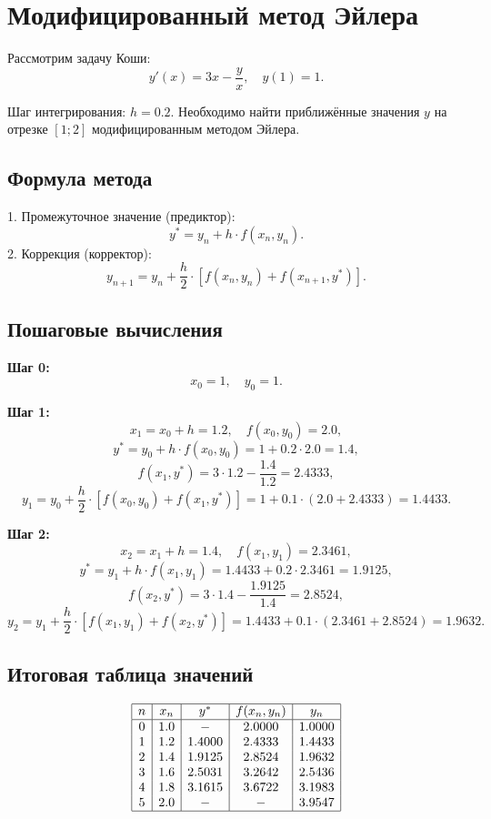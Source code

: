 \documentclass[a4paper,12pt]{article}
\begin{document}
\section{Модифицированный метод Эйлера}


Рассмотрим задачу Коши:
\[
y'(x) = 3x - \frac{y}{x}, \quad y(1) = 1.
\]

Шаг интегрирования: \( h = 0.2 \). Необходимо найти приближённые значения \( y \) на отрезке \([1; 2]\) модифицированным методом Эйлера.

\subsection*{Формула метода}
1. Промежуточное значение (предиктор):
\[
y^* = y_n + h \cdot f(x_n, y_n).
\]
2. Коррекция (корректор):
\[
y_{n+1} = y_n + \frac{h}{2} \cdot \left[f(x_n, y_n) + f(x_{n+1}, y^*)\right].
\]

\subsection*{Пошаговые вычисления}

\textbf{Шаг 0:}
\[
x_0 = 1, \quad y_0 = 1.
\]

\textbf{Шаг 1:}
\[
x_1 = x_0 + h = 1.2, \quad f(x_0, y_0) = 2.0,
\]
\[
y^* = y_0 + h \cdot f(x_0, y_0) = 1 + 0.2 \cdot 2.0 = 1.4,
\]
\[
f(x_1, y^*) = 3 \cdot 1.2 - \frac{1.4}{1.2} = 2.4333,
\]
\[
y_1 = y_0 + \frac{h}{2} \cdot \left[f(x_0, y_0) + f(x_1, y^*)\right] = 1 + 0.1 \cdot (2.0 + 2.4333) = 1.4433.
\]

\textbf{Шаг 2:}
\[
x_2 = x_1 + h = 1.4, \quad f(x_1, y_1) = 2.3461,
\]
\[
y^* = y_1 + h \cdot f(x_1, y_1) = 1.4433 + 0.2 \cdot 2.3461 = 1.9125,
\]
\[
f(x_2, y^*) = 3 \cdot 1.4 - \frac{1.9125}{1.4} = 2.8524,
\]
\[
y_2 = y_1 + \frac{h}{2} \cdot \left[f(x_1, y_1) + f(x_2, y^*)\right] = 1.4433 + 0.1 \cdot (2.3461 + 2.8524) = 1.9632.
\]

\subsection*{Итоговая таблица значений}

\[
\begin{array}{|c|c|c|c|c|}
\hline
n & x_n & y^* & f(x_n, y_n) & y_n \\ \hline
0 & 1.0 & - & 2.0000 & 1.0000 \\
1 & 1.2 & 1.4000 & 2.4333 & 1.4433 \\
2 & 1.4 & 1.9125 & 2.8524 & 1.9632 \\
3 & 1.6 & 2.5031 & 3.2642 & 2.5436 \\
4 & 1.8 & 3.1615 & 3.6722 & 3.1983 \\
5 & 2.0 & - & - & 3.9547 \\ \hline
\end{array}
\]
\end{document}
